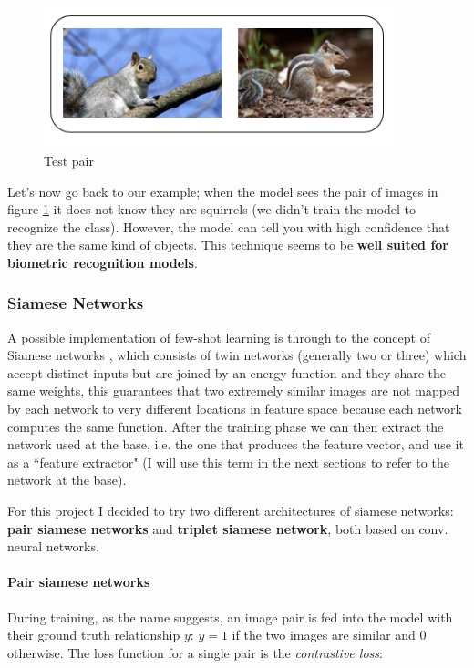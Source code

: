 \documentclass{article}
\begin{document}
\begin{figure}[H]
    \centering
    \includegraphics[width=4in]{imgs/squirrel.png}
    \caption{Test pair}
    \label{fig:exampleTP}
\end{figure}
Let's now go back to our example; when the model sees the pair of images in figure \ref{fig:exampleTP} it does not know they are squirrels (we didn't train the model to recognize the class). However, the model can tell you with high confidence that they are the same kind of objects. This technique seems to be \textbf{well suited for biometric recognition models}.

\subsubsection{Siamese Networks}
A possible implementation of few-shot learning is through to the concept of Siamese networks \cite{koch2015siamese}, which consists of twin networks (generally two or three) which accept distinct inputs but are joined by an energy function and they share the same weights, this guarantees that two extremely similar images are not mapped by each network to very different locations in feature space because each network computes the same function. After the training phase we can then extract the network used at the base, i.e. the one that produces the feature vector, and use it as a ``feature extractor" (I will use this term in the next sections to refer to the network at the base).

\bigskip
For this project I decided to try two different architectures of siamese networks: \textbf{pair siamese networks} and \textbf{triplet siamese network}, both based on conv. neural networks.

\paragraph{Pair siamese networks}

During training, as the name suggests, an image pair is fed into the model with their ground truth relationship $y$: $y = 1$ if the two images are similar and 0 otherwise. The loss function for a single pair is the \textit{contrastive loss}:
\end{document}
